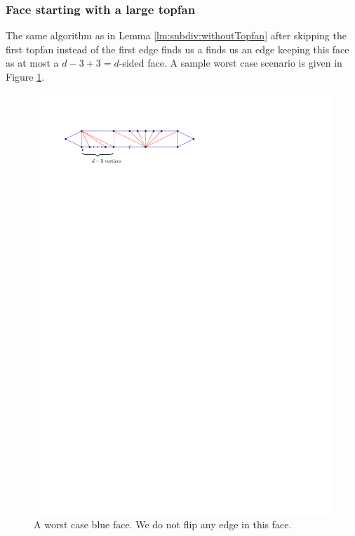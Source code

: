 \subsubsection{Face starting with a large topfan}
The same algorithm as in Lemma \ref{lm:subdiv:withoutTopfan} after skipping the first topfan instead of the first edge finds us a finds us an edge keeping this face as at most a $ d - 3 +3 = d$-sided face. A sample worst case scenario is given in Figure \ref{fig:subdiv:worstCaseWithTopFan}.

\begin{figure}[h]
  \centering
  \includegraphics[scale=1]{blueFaceSubdivision/img/worstCaseWithTopFan}
  \caption{A worst case blue face. We do not flip any edge in this face.}
  \label{fig:subdiv:worstCaseWithTopFan}
\end{figure}


